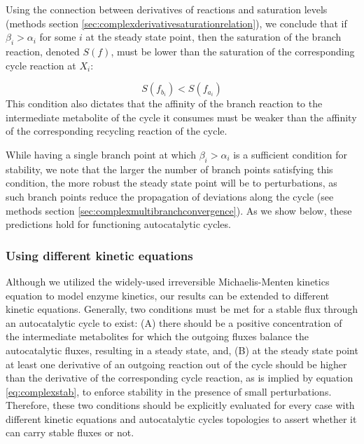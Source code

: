 Using the connection between derivatives of reactions and saturation levels (methods section \ref{sec:complexderivativesaturationrelation}), we conclude that if $\beta_i > \alpha_i$ for some $i$ at the steady state point, then the saturation of the branch reaction, denoted $S(f)$, must be lower than the saturation of the corresponding cycle reaction at $X_i$:

    \begin{equation}
        S(f_{b_i}) < S(f_{a_i})
      \label{eq:complexsat}
    \end{equation}
    This condition also dictates that the affinity of the branch reaction to the intermediate metabolite of the cycle it consumes must be weaker than the affinity of the corresponding recycling reaction of the cycle.

    While having a single branch point at which $\beta_i > \alpha_i$ is a sufficient condition for stability, we note that the larger the number of branch points satisfying this condition, the more robust the steady state point will be to perturbations, as such branch points reduce the propagation of deviations along the cycle (see methods section \ref{sec:complexmultibranchconvergence}).
    As we show below, these predictions hold for functioning autocatalytic cycles.
    \subsubsection{Using different kinetic equations}
    Although we utilized the widely-used irreversible Michaelis-Menten kinetics equation to model enzyme kinetics, our results can be extended to different kinetic equations.
    Generally, two conditions must be met for a stable flux through an autocatalytic cycle to exist: (A) there should be a positive concentration of the intermediate metabolites for which the outgoing fluxes balance the autocatalytic fluxes, resulting in a steady state, and, (B) at the steady state point at least one derivative of an outgoing reaction out of the cycle should be higher than the derivative of the corresponding cycle reaction, as is implied by equation \ref{eq:complexstab}, to enforce stability in the presence of small perturbations.
    Therefore, these two conditions should be explicitly evaluated for every case with different kinetic equations and autocatalytic cycles topologies to assert whether it can carry stable fluxes or not.


